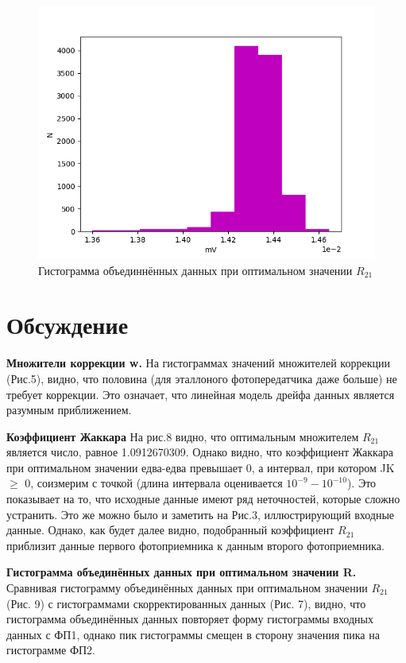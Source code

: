 \documentclass[a4paper,14pt]{article}
\begin{document}
	\begin{figure}[H]
		\begin{center}
			\includegraphics[scale=0.5]{../image/jakkar_combined_hist.png}
		\end{center}
		\caption{Гистограмма объединнённых данных при оптимальном значении $R_{21}$} 
	\end{figure}
	
	\section{Обсуждение}
	\textbf{Множители коррекции w.}
	На гистограммах значений множителей коррекции (Рис.5), видно, что половина (для эталлоного фотопередатчика даже больше) не требует коррекции. Это означает, что линейная модель дрейфа данных является разумным приближением.
	
	
	
	\textbf{Коэффициент Жаккара}
	На рис.8 видно, что оптимальным множителем $R_{21}$ является число, равное 1.0912670309. Однако видно, что коэффициент Жаккара при оптимальном значении едва-едва превышает 0, а интервал, при котором JK $\geq$ 0, соизмерим с точкой (длина интервала оценивается $10^{-9} - 10^{-10} $). Это показывает на то, что исходные данные имеют ряд неточностей, которые сложно устранить. Это же можно было и заметить на Рис.3, иллюстрирующий входные данные. Однако, как будет далее видно, подобранный коэффициент $R_{21}$ приблизит данные первого фотоприемника к данным второго фотоприемника.
	
	
	
	\textbf{Гистограмма объединённых данных при оптимальном значении R.}
	Сравнивая гистограмму объединённых данных при оптимальном значении $R_{21}$ (Рис. 9) с гистограммами скорректированных данных (Рис. 7), видно, что гистограмма объединённых данных повторяет форму гистограммы входных данных с ФП1, однако пик гистограммы смещен в сторону значения пика на гистограмме ФП2.
	
\end{document}
